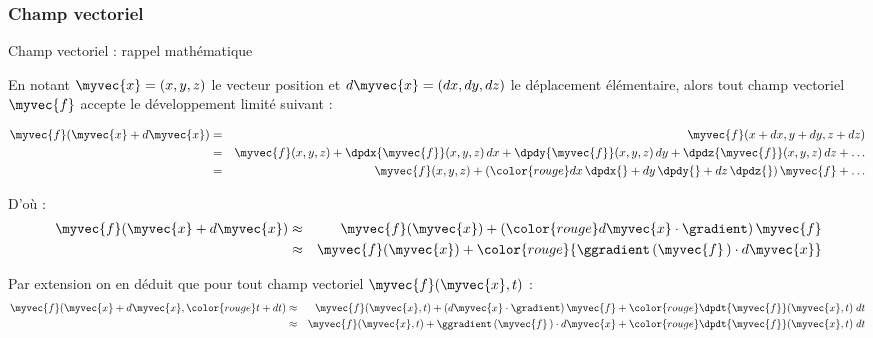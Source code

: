 \subsubsection{Champ vectoriel}
\begin{frame}{Champ vectoriel : rappel mathématique}

\small

En notant $\myvec{x} = (x, y, z)$ le vecteur position 
et $d\myvec{x} = (dx, dy, dz)$ le déplacement élémentaire,
alors tout champ vectoriel $\myvec{f}$ accepte le développement limité suivant :

\begin{eqnarray*}
\myvec{f}(\myvec{x} + d\myvec{x}) & = & \myvec{f}(x+dx, y+dy, z+dz)
\\
& = & \myvec{f}(x, y, z) + \dpdx{\myvec{f}}(x, y, z)\,dx + \dpdy{\myvec{f}}(x, y, z)\, dy + \dpdz{\myvec{f}}(x, y, z)\, dz + \ldots
\\
& = & \myvec{f}(x, y, z) 
      + \left ( {\color{rouge} dx\,\dpdx{} + dy\,\dpdy{} + dz\,\dpdz{}} \right ) \myvec{f} + \ldots
\end{eqnarray*}

D'où :
\begin{eqnarray*}
	\myvec{f}(\myvec{x} + d\myvec{x}) 
	& \approx &
	\myvec{f}(\myvec{x}) + \left ( {\color{rouge} d\myvec{x} \cdot \gradient} \right ) \myvec{f}  
	\\
	& \approx & 
	\myvec{f}(\myvec{x}) + \color{rouge}  {\ggradient \left ( \myvec{f} \, \right ) \cdot d\myvec{x}} 
\end{eqnarray*}

\bigskip

Par extension on en déduit que pour tout champ vectoriel $\myvec{f}(\myvec{x}, t)$ :
\begin{eqnarray*}
	\myvec{f}(\myvec{x} + d\myvec{x}, {\color{rouge}t+dt}) 
	& \approx & 
	\myvec{f}(\myvec{x}, t) + 
	\left ( d\myvec{x} \cdot \gradient \right ) \myvec{f}
	+ {\color{rouge} \dpdt{\myvec{f}}(\myvec{x}, t) \; dt} 
	\\
	& \approx &
	\myvec{f}(\myvec{x}, t) + 
	\ggradient \left ( \myvec{f} \, \right ) \cdot d\myvec{x}
	+ {\color{rouge} \dpdt{\myvec{f}}(\myvec{x}, t) \; dt} 
\end{eqnarray*}


\vspace{0mm}

\end{frame}

